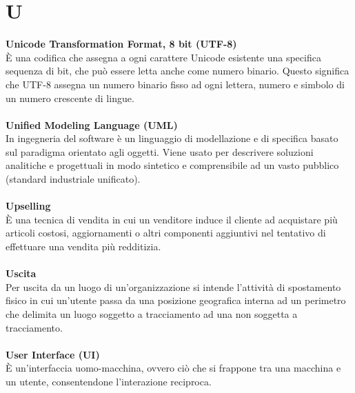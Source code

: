 \section{U}
\textbf{Unicode Transformation Format, 8 bit (UTF-8)}\\
È una codifica che assegna a ogni carattere Unicode esistente una specifica sequenza di bit, che può essere letta anche come numero binario. Questo significa che UTF-8 assegna un numero binario fisso ad ogni lettera, numero e simbolo di un numero crescente di lingue. \\ \\
\textbf{Unified Modeling Language (UML)}\\
In ingegneria del software è un linguaggio di modellazione e di specifica basato sul paradigma orientato agli oggetti. Viene usato per descrivere soluzioni analitiche e progettuali in modo sintetico e comprensibile ad un vasto pubblico (standard industriale unificato). \\ \\
\textbf{Upselling}\\
È una tecnica di vendita in cui un venditore induce il cliente ad acquistare più articoli costosi, aggiornamenti o altri componenti aggiuntivi nel tentativo di effettuare una vendita più redditizia. \\ \\
\textbf{Uscita}\\
Per uscita da un luogo di un'organizzazione si intende l'attività di spostamento fisico in cui un'utente passa da una posizione geografica interna ad un perimetro che delimita un luogo soggetto a tracciamento ad una non soggetta a tracciamento. \\ \\
\textbf{User Interface (UI)}\\
È un'interfaccia uomo-macchina, ovvero ciò che si frappone tra una macchina e un utente, consentendone l'interazione reciproca. \\ \\
\clearpage